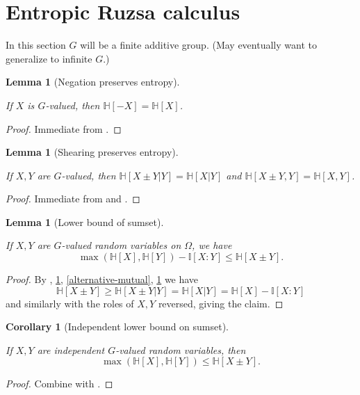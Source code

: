 \documentclass[10pt,a4paper]{article}
\newtheorem{lemma}[theorem]{Lemma}
\newtheorem{corollary}[theorem]{Corollary}
\newcommand{\lean}[1]{}
\newcommand{\uses}[1]{}
\newcommand{\leanok}{}
\newcommand{\chapter}[1]{\section{#1}}
\newcommand{\bbH}{\mathbb{H}}
\newcommand{\bbI}{\mathbb{I}}
\begin{document}
\chapter{Entropic Ruzsa calculus}

In this section $G$ will be a finite additive group.  (May eventually want to generalize to infinite $G$.)

\begin{lemma}[Negation preserves entropy]\label{neg-ent}
  \lean{ProbabilityTheory.entropy_neg}\leanok
  If $X$ is $G$-valued, then $\bbH[-X]=\bbH[X]$.
\end{lemma}

\begin{proof}
  \uses{relabeled-entropy}\leanok Immediate from .
\end{proof}

\begin{lemma}[Shearing preserves entropy]\label{shear-ent}
  \lean{ProbabilityTheory.condEntropy_add_right, ProbabilityTheory.condEntropy_add_left, ProbabilityTheory.condEntropy_sub_right, ProbabilityTheory.condEntropy_sub_left}\leanok
  If $X,Y$ are $G$-valued, then $\bbH[X \pm Y | Y]=\bbH[X|Y]$ and $\bbH[X \pm Y, Y] = \bbH[X, Y]$.
\end{lemma}

\begin{proof}
  \uses{relabeled-entropy-cond,chain-rule}\leanok Immediate from  and .
\end{proof}

\begin{lemma}[Lower bound of sumset]\label{sumset-lower-gen}
  \lean{ProbabilityTheory.max_entropy_sub_mutualInfo_le_entropy_add, ProbabilityTheory.max_entropy_sub_mutualInfo_le_entropy_sub}\leanok
  If $X,Y$ are $G$-valued random variables on $\Omega$, we have
$$ \max(\bbH[X], \bbH[Y]) -  \bbI[X:Y] \leq \bbH[X \pm Y].$$
\end{lemma}

\begin{proof}\uses{cond-reduce, alternative-mutual, shear-ent, neg-ent} \leanok
    By , \ref{shear-ent}, \ref{alternative-mutual}, \ref{neg-ent} we have
$$
 \bbH[X\pm Y] \geq \bbH[X\pm Y|Y] = \bbH[X|Y]= \bbH[X] -  \bbI[X:Y]
$$
and similarly with the roles of $X,Y$ reversed, giving the claim.
\end{proof}


\begin{corollary}[Independent lower bound on sumset]
  \label{sumset-lower}
  \lean{ProbabilityTheory.max_entropy_le_entropy_add, ProbabilityTheory.max_entropy_le_entropy_sub}
  \leanok

  If $X,Y$ are independent $G$-valued random variables, then
  $$\max(\bbH[X], \bbH[Y]) \leq \bbH[X\pm Y]. $$
\end{corollary}
\begin{proof}
  \uses{sumset-lower-gen, vanish-entropy}
  \leanok

  Combine  with .
\end{proof}
\end{document}
